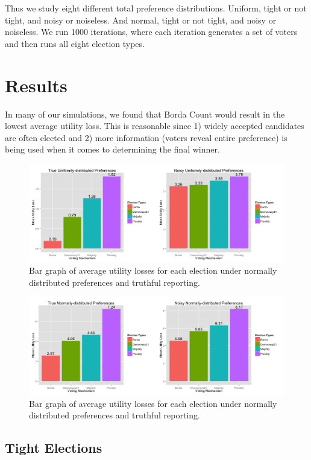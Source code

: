 \documentclass[11pt]{scrartcl}
\begin{document}
Thus we study eight different total preference distributions. Uniform, tight or not tight, and noisy or noiseless. And normal, tight or not tight, and noisy or noiseless. We run 1000 iterations, where each iteration generates a set of voters and then runs all eight election types.

\section{Results}

In many of our simulations, we found that Borda Count would result in the lowest average utility loss. This is reasonable since 1) widely accepted candidates are often elected and 2) more information (voters reveal entire preference) is being used when it comes to determining the final winner.  

\begin{figure}[H]\center
\includegraphics[scale=0.38]{uniform.png}
\caption{Bar graph of average utility losses for each election under normally distributed preferences and truthful reporting.}
\end{figure}

\begin{figure}[H]\center
\includegraphics[scale=0.38]{normal.png}
\caption{Bar graph of average utility losses for each election under normally distributed preferences and truthful reporting.}
\end{figure}

\subsection{Tight Elections}
\end{document}

